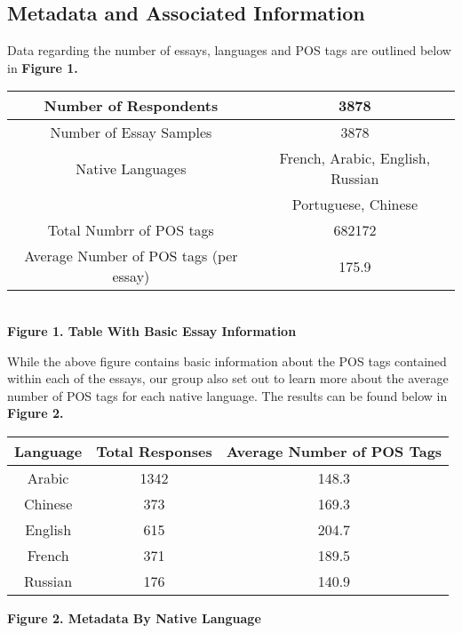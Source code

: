 \documentclass[12pt]{article}
\newcommand\tab[1][1cm]{\hspace*{#1}}
\begin{document}
 \subsection{Metadata and Associated Information}
 \tab Data regarding the number of essays, languages and POS tags are outlined below in \textbf{Figure 1.}
 \begin{center}
 	\begin{tabular}{|c|c|}
 		\hline
 		Number of Respondents & 3878\\
 		\hline
 		Number of Essay Samples & 3878\\
		\hline
		Native Languages & French, Arabic,
		English, Russian\\
		  & Portuguese, Chinese\\
			\hline
		Total Numbrr of POS tags & 682172\\
			\hline
		Average Number of POS tags (per essay) & 175.9\\
			\hline
 	\end{tabular}\\
 	\textbf{Figure 1. Table With Basic Essay Information}
 \end{center}
While the above figure contains basic information about the POS tags contained within each of the essays, our group also set out to learn more about the average number of POS tags for each native language. The results can be found below in \textbf{Figure 2.}
 \begin{center}
 	\begin{tabular}{|c|c|c|}
 		\hline
 		\textbf{Language} & \textbf{Total Responses} & \textbf{Average Number of POS Tags}\\
 		\hline
 		Arabic & 1342 & 148.3\\
 		\hline
 		Chinese & 373 & 169.3\\
 		\hline
 		English & 615 & 204.7\\
 		\hline
 		French & 371 & 189.5\\
 		\hline
 		Russian & 176 & 140.9\\
 		\hline
 	\end{tabular}
 	\textbf{Figure 2. Metadata By Native Language}
 \end{center}
\end{document}

